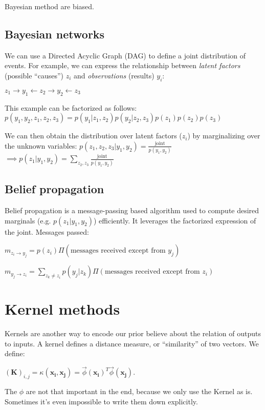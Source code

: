 \documentclass[10pt,a4paper,landscape]{article}
\renewcommand{\bf}[1]{\ensuremath{\mathbf{#1}}}
\begin{document}
\begin{multicols*}{4}
Bayesian method are biased.

\subsection{Bayesian networks}
We can use a Directed Acyclic Graph (DAG) to define a joint distribution of events. For example, we can express the relationship between \textit{latent factors} (possible ``causes'') $z_i$ and \textit{observations} (results) $y_i$:

$z_1 \rightarrow y_1 \leftarrow z_2 \rightarrow y_2 \leftarrow z_3$

This example can be factorized as follows:
$p(y_1, y_2, z_1, z_2, z_3) = p(y_1 | z_1, z_2) p(y_2 | z_2, z_3) p(z_1) p(z_2) p(z_3)$

We can then obtain the distribution over latent factors ($z_i$) by marginalizing over the unknown variables:
$p(z_1, z_2, z_3 | y_1, y_2) = \frac{\text{joint}}{p(y_1, y_2)}$\\
$\implies p(z_1 | y_1, y_2) = \sum_{z_2, z_3} \frac{\text{joint}}{p(y_1, y_2)}$

\subsection{Belief propagation}
Belief propagation is a message-passing based algorithm used to compute desired marginals (e.g. $p(z_1 | y_1, y_2)$) efficiently. It leverages the factorized expression of the joint. Messages passed:

$m_{z_i \rightarrow y_j} = p(z_i) \Pi(\text{messages received except from } y_j)$

$m_{y_j \rightarrow z_i} = \sum_{z_k \neq z_i} p(y_j | z_k) \Pi(\text{messages received except from } z_i)$

\section{Kernel methods}
Kernels are another way to encode our prior believe about the relation of outputs to inputs. A kernel defines a distance measure, or ``similarity'' of two vectors. We define:

$(\bf{K})_{i,j} = \kappa(\bf{x_i}, \bf{x_j}) = \vec \phi(\bf{x_i})^T \vec \phi(\bf{x_j})$.

The $\phi$ are not that important in the end, because we only use the Kernel as is. Sometimes it's even impossible to write them down explicitly.


\end{multicols*}
\end{document}
